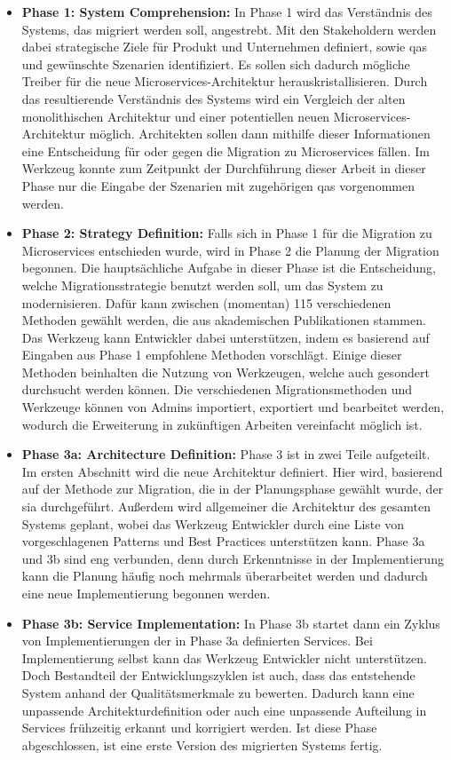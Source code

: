 \begin{itemize}
	\item \textbf{Phase 1: System Comprehension:}
	In Phase 1 wird das Verständnis des Systems, das migriert werden soll, angestrebt.
	Mit den Stakeholdern werden dabei strategische Ziele für Produkt und Unternehmen definiert, sowie \glspl{qa} und gewünschte Szenarien identifiziert.
	Es sollen sich dadurch mögliche Treiber für die neue Microservices-Architektur herauskristallisieren.
	Durch das resultierende Verständnis des Systems wird ein Vergleich der alten monolithischen Architektur und einer potentiellen neuen Microservices-Architektur möglich.
	Architekten sollen dann mithilfe dieser Informationen eine Entscheidung für oder gegen die Migration zu Microservices fällen.
	Im Werkzeug konnte zum Zeitpunkt der Durchführung dieser Arbeit in dieser Phase nur die Eingabe der Szenarien mit zugehörigen \glspl{qa} vorgenommen werden.
	\item \textbf{Phase 2: Strategy Definition:}
	Falls sich in Phase 1 für die Migration zu Microservices entschieden wurde, wird in Phase 2 die Planung der Migration begonnen.
	Die hauptsächliche Aufgabe in dieser Phase ist die Entscheidung, welche Migrationsstrategie benutzt werden soll, um das System zu modernisieren.
	Dafür kann zwischen (momentan) 115 verschiedenen Methoden gewählt werden, die aus akademischen Publikationen stammen.
	Das Werkzeug kann Entwickler dabei unterstützen, indem es basierend auf Eingaben aus Phase 1 empfohlene Methoden vorschlägt.
	Einige dieser Methoden beinhalten die Nutzung von Werkzeugen, welche auch gesondert durchsucht werden können.
	Die verschiedenen Migrationsmethoden und Werkzeuge können von Admins importiert, exportiert und bearbeitet werden, wodurch die Erweiterung in zukünftigen Arbeiten vereinfacht möglich ist.
	\item \textbf{Phase 3a: Architecture Definition:}
	Phase 3 ist in zwei Teile aufgeteilt.
	Im ersten Abschnitt wird die neue Architektur definiert.
	Hier wird, basierend auf der Methode zur Migration, die in der Planungsphase gewählt wurde, der \gls{sia} durchgeführt.
	Außerdem wird allgemeiner die Architektur des gesamten Systems geplant, wobei das Werkzeug Entwickler durch eine Liste von vorgeschlagenen Patterns und Best Practices unterstützen kann.
	 Phase 3a und 3b sind eng verbunden, denn durch Erkenntnisse in der Implementierung kann die Planung häufig noch mehrmals überarbeitet werden und dadurch eine neue Implementierung begonnen werden.
	\item \textbf{Phase 3b: Service Implementation:} In Phase 3b startet dann ein Zyklus von Im\-ple\-men\-tie\-rung\-en der in Phase 3a definierten Services.
	Bei Implementierung selbst kann das Werkzeug Entwickler nicht unterstützen.
	Doch Bestandteil der Entwicklungszyklen ist auch, dass das entstehende System anhand der Qualitätsmerkmale zu bewerten.
	Dadurch kann eine unpassende Architekturdefinition oder auch eine unpassende Aufteilung in Services frühzeitig erkannt und korrigiert werden.
	Ist diese Phase abgeschlossen, ist eine erste Version des migrierten Systems fertig.
\end{itemize}

